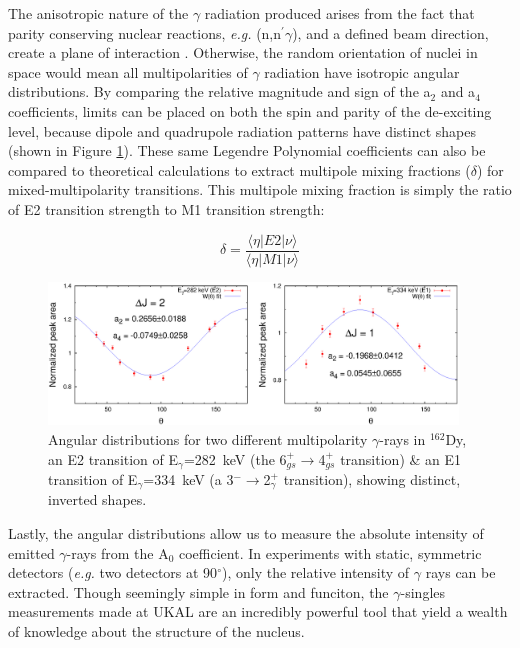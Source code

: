 The anisotropic nature of the $\gamma$ radiation produced arises from the fact that parity conserving nuclear reactions, \textit{e.g.} (n,n$^{\prime}\gamma$), and a defined beam direction, create a plane of interaction . Otherwise, the random orientation of nuclei in space would mean all multipolarities of $\gamma$ radiation  have isotropic angular distributions. By comparing the relative magnitude and sign of the a$_2$ and a$_4$ coefficients, limits can be placed on both the spin and parity of the de-exciting level, because dipole and quadrupole radiation patterns have distinct shapes (shown in Figure \ref{fig:multipole_diff}). These same Legendre Polynomial coefficients can also be compared to theoretical calculations to extract multipole mixing fractions ($\delta$) for mixed-multipolarity transitions. This multipole mixing fraction is simply the ratio of E2 transition strength to M1 transition strength:

\begin{equation} \label{eq:multipolemixing}
\delta=\frac{\langle\eta\vert E2 \vert\nu\rangle}{\langle\eta\vert M1 \vert\nu\rangle}
\end{equation}

\begin{figure}[h] 
\begin{center}
\includegraphics[width=0.97\textwidth]{figures/multipole_diff.eps}
\caption{Angular distributions for two different multipolarity $\gamma$-rays in $^{162}$Dy, an E2 transition of E$_\gamma$=282~keV (the 6$^+_{gs}\rightarrow$4$^+_{gs}$ transition) \& an E1 transition of E$_\gamma$=334~keV (a 3$^-\rightarrow$2$^+_\gamma$ transition), showing distinct, inverted shapes.}
\label{fig:multipole_diff}
\end{center}
\end{figure}

Lastly, the angular distributions allow us to measure the absolute intensity of emitted $\gamma$-rays from the A$_0$ coefficient. In experiments with static, symmetric detectors (\textit{e.g.} two detectors at 90$^{\circ}$), only the relative intensity of $\gamma$ rays can be extracted. Though seemingly simple in form and funciton, the $\gamma$-singles measurements made at UKAL are an incredibly powerful tool that yield a wealth of knowledge about the structure of the nucleus.

